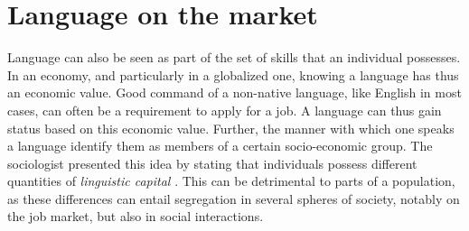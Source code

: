 \documentclass[../thesis.tex]{subfiles}
\begin{document}
\section{Language on the market} %
Language can also be seen as part of the set of skills that an individual possesses. In
an economy, and particularly in a globalized one, knowing a language has thus an
economic value. Good command of a non-native language, like English in most cases, can
often be a requirement to apply for a job. A language can thus gain status based on this
economic value. Further, the manner with which one speaks a language  identify them as
members of a certain socio-economic group. The sociologist
 presented this idea by stating that
individuals possess different quantities of \emph{linguistic capital}
\cite{BourdieuLanguageSymbolic2009}. This can be detrimental to parts of a population,
as these differences can entail segregation in several spheres of society, notably on
the job market, but also in social interactions.




\end{document}
